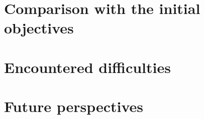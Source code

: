 \section{Comparison with the initial objectives}



\section{Encountered difficulties}



\section{Future perspectives}

